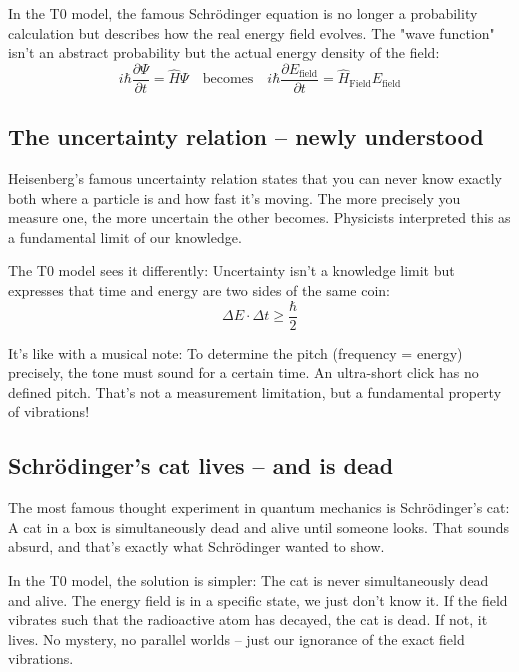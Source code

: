 \documentclass[12pt,a4paper]{article}
\newcommand{\Efield}{E_\text{field}}
\begin{document}
	\begin{quantum}
		In the T0 model, the famous Schrödinger equation is no longer a probability calculation but describes how the real energy field evolves. The "wave function" isn't an abstract probability but the actual energy density of the field:
		\begin{equation}
			i\hbar \frac{\partial \Psi}{\partial t} = \hat{H}\Psi \quad \text{becomes} \quad i\hbar \frac{\partial \Efield}{\partial t} = \hat{H}_{\text{Field}}\Efield
		\end{equation}
	\end{quantum}
	
	\subsection{The uncertainty relation -- newly understood}
	
	Heisenberg's famous uncertainty relation states that you can never know exactly both where a particle is and how fast it's moving. The more precisely you measure one, the more uncertain the other becomes. Physicists interpreted this as a fundamental limit of our knowledge.
	
	The T0 model sees it differently: Uncertainty isn't a knowledge limit but expresses that time and energy are two sides of the same coin:
	\begin{equation}
		\Delta E \cdot \Delta t \geq \frac{\hbar}{2}
	\end{equation}
	
	It's like with a musical note: To determine the pitch (frequency = energy) precisely, the tone must sound for a certain time. An ultra-short click has no defined pitch. That's not a measurement limitation, but a fundamental property of vibrations!
	
	\subsection{Schrödinger's cat lives -- and is dead}
	
	The most famous thought experiment in quantum mechanics is Schrödinger's cat: A cat in a box is simultaneously dead and alive until someone looks. That sounds absurd, and that's exactly what Schrödinger wanted to show.
	
	In the T0 model, the solution is simpler: The cat is never simultaneously dead and alive. The energy field is in a specific state, we just don't know it. If the field vibrates such that the radioactive atom has decayed, the cat is dead. If not, it lives. No mystery, no parallel worlds -- just our ignorance of the exact field vibrations.
	
\end{document}
